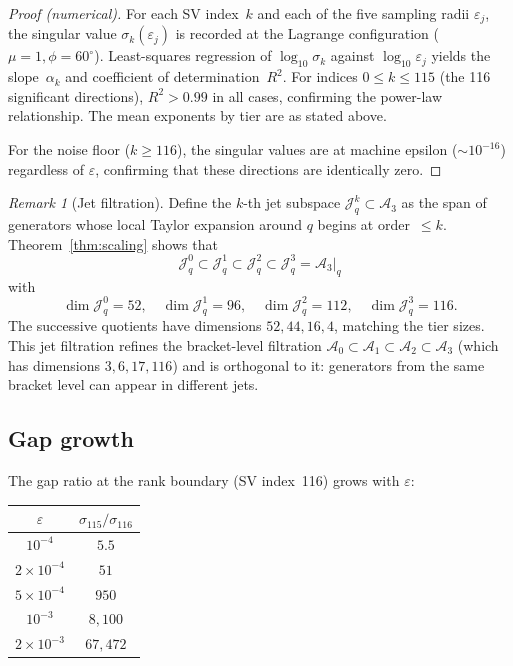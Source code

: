 \documentclass[11pt,a4paper]{article}
\theoremstyle{remark}
\newtheorem{remark}[theorem]{Remark}
\newcommand{\cA}{\mathcal{A}}
\newcommand{\cJ}{\mathcal{J}}
\begin{document}
\begin{proof}[Proof (numerical)]
For each SV index~$k$ and each of the five sampling radii
$\varepsilon_j$, the singular value $\sigma_k(\varepsilon_j)$
is recorded at the Lagrange configuration
($\mu = 1, \phi = 60^\circ$).  Least-squares regression
of $\log_{10}\sigma_k$ against $\log_{10}\varepsilon_j$
yields the slope~$\alpha_k$ and coefficient of
determination~$R^2$.  For indices $0 \le k \le 115$
(the 116 significant directions), $R^2 > 0.99$ in all
cases, confirming the power-law relationship.  The
mean exponents by tier are as stated above.

For the noise floor ($k \ge 116$), the singular values
are at machine epsilon ($\sim\!10^{-16}$) regardless of
$\varepsilon$, confirming that these directions are
identically zero.
\end{proof}

\begin{remark}[Jet filtration]
Define the $k$-th jet subspace $\cJ^k_q \subset \cA_3$ as
the span of generators whose local Taylor expansion around
$q$ begins at order~$\le k$.  Theorem~\ref{thm:scaling}
shows that
\[
  \cJ^0_q \subset \cJ^1_q \subset \cJ^2_q
  \subset \cJ^3_q = \cA_3|_q
\]
with
\[
  \dim \cJ^0_q = 52, \quad
  \dim \cJ^1_q = 96, \quad
  \dim \cJ^2_q = 112, \quad
  \dim \cJ^3_q = 116.
\]
The successive quotients have dimensions $52, 44, 16, 4$,
matching the tier sizes.  This jet filtration refines the
bracket-level filtration $\cA_0 \subset \cA_1 \subset
\cA_2 \subset \cA_3$ (which has dimensions $3, 6, 17,
116$) and is orthogonal to it: generators from the same
bracket level can appear in different jets.
\end{remark}

\subsection{Gap growth}

The gap ratio at the rank boundary (SV index~116) grows
with $\varepsilon$:

\begin{center}
\begin{tabular}{@{}cc@{}}
\toprule
$\varepsilon$ & $\sigma_{115}/\sigma_{116}$ \\
\midrule
$10^{-4}$ & $5.5$ \\
$2 \times 10^{-4}$ & $51$ \\
$5 \times 10^{-4}$ & $950$ \\
$10^{-3}$ & $8{,}100$ \\
$2 \times 10^{-3}$ & $67{,}472$ \\
\bottomrule
\end{tabular}
\end{center}
\end{document}
